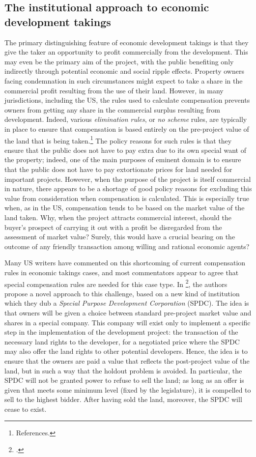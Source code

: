 \subsection{The institutional approach to economic development takings}

The primary distinguishing feature of economic development takings is that they give the taker an opportunity to profit commercially from the development. This may even be the primary aim of the project, with the public benefiting only indirectly through potential economic and social ripple effects. Property owners facing condemnation in such circumstances might expect to take a share in the commercial profit resulting from the use of their land. However, in many jurisdictions, including the US, the rules used to calculate compensation prevents owners from getting any share in the commercial surplus resulting from development. Indeed, various {\it elimination rules}, or {\it no scheme} rules, are typically in place to ensure that compensation is based entirely on the pre-project value of the land that is being taken.\footnote{References.} The policy reasons for such rules is that they ensure that the public does not have to pay extra due to its own special want of the property; indeed, one of the main purposes of eminent domain is to ensure that the public does not have to pay extortionate prices for land needed for important projects. However, when the purpose of the project is itself commercial in nature, there appears to be a shortage of good policy reasons for excluding this value from consideration when compensation is calculated. This is especially true when, as in the US, compensation tends to be based on the market value of the land taken. Why, when the project attracts commercial interest, should the buyer's prospect of carrying it out with a profit be disregarded from the assessment of market value? Surely, this would have a crucial bearing on the outcome of any friendly transaction among willing and rational economic agents? 

Many US writers have commented on this shortcoming of current compensation rules in economic takings cases, and most commentators appear to agree that special compensation rules are needed for this case type. In \footcite{eminc07}, the authors propose a novel approach to this challenge, based on a new kind of institution which they dub a {\it Special Purpose Development Corporation} (SPDC). The idea is that owners will be given a choice between standard pre-project market value and shares in a special company. This company will exist only to implement a specific step in the implementation of the development project: the transaction of the necessary land rights to the developer, for a negotiated price where the SPDC may also offer the land rights to other potential developers. Hence, the idea is to ensure that the owners are paid a value that reflects the post-project value of the land, but in such a way that the holdout problem is avoided. In particular, the SPDC will not be granted power to refuse to sell the land; as long as an offer is given that meets some minimum level (fixed by the legislature), it is compelled to sell to the highest bidder.  After having sold the land, moreover, the SPDC will cease to exist. 

